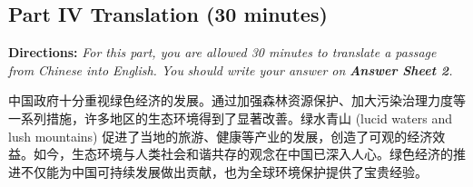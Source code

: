 \documentclass[UTF8,11pt]{ctexart}
\begin{document}
\subsection*{\textbf{Part IV Translation (30 minutes)}}


\textbf{Directions: }\textit{For this part, you are allowed 30 minutes to translate a passage from Chinese into English. You} \textit{should write your answer on }\textbf{\textit{Answer Sheet 2}}\textit{.}


中国政府十分重视绿色经济的发展。通过加强森林资源保护、加大污染治理力度等一系列措施，许多地区的生态环境得到了显著改善。绿水青山 (lucid waters and lush mountains) 促进了当地的旅游、健康等产业的发展，创造了可观的经济效益。如今，生态环境与人类社会和谐共存的观念在中国已深入人心。绿色经济的推进不仅能为中国可持续发展做出贡献，也为全球环境保护提供了宝贵经验。
\end{document}
